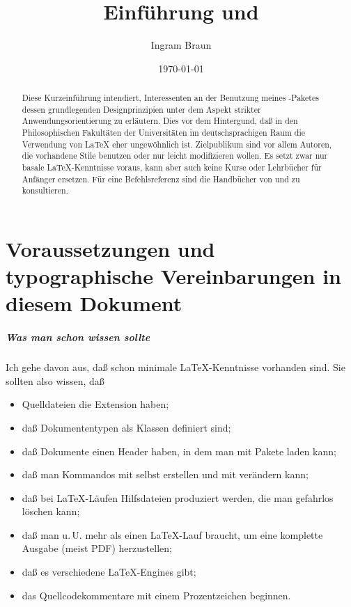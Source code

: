 \documentclass[12pt,table]{scrreprt}
\title{Einführung \blx und \archbib [v2.3]}
\author{Ingram Braun}
\date{\today}
\begin{document}
\DefineShortVerb{\|} %

\maketitle

\begin{abstract}\noindent
Diese Kurzeinführung intendiert, Interessenten an der Benutzung meines \archbib-Paketes dessen grundlegenden Designprinzipien unter dem Aspekt strikter Anwendungsorientierung zu erläutern. Dies vor dem Hintergund, daß in den Philosophischen Fakultäten der Universitäten im deutschsprachigen Raum die Verwendung von \LaTeX{} eher ungewöhnlich ist. Zielpublikum sind vor allem Autoren, die vorhandene Stile benutzen oder nur leicht modifizieren wollen. Es setzt zwar nur basale \LaTeX{}-Kenntnisse voraus, kann aber auch keine Kurse oder Lehrbücher für Anfänger ersetzen. Für eine Befehlsreferenz sind die Handbücher von \blx und \archbib zu konsultieren.
\end{abstract}
 
\tableofcontents

\chapter{Voraussetzungen und typographische Vereinbarungen in diesem Dokument}

\paragraph{Was man schon wissen sollte}
Ich gehe davon aus, daß schon minimale \LaTeX-Kenntnisse vorhanden sind. Sie sollten also wissen, daß
\begin{itemize}
\item Quelldateien die Extension  haben;
\item daß Dokumententypen als Klassen definiert sind;
\item daß Dokumente einen Header haben, in dem man mit  Pakete laden kann;
\item daß man Kommandos mit  selbst erstellen und mit  verändern kann;
\item daß bei \LaTeX-Läufen Hilfsdateien produziert werden, die man gefahrlos löschen kann;
\item daß man u.\,U. mehr als einen \LaTeX-Lauf braucht, um eine komplette Ausgabe (meist PDF) herzustellen;
\item daß es verschiedene \LaTeX-Engines gibt;
\item das Quellcodekommentare mit einem Prozentzeichen beginnen.
\end{itemize}
\end{document}
